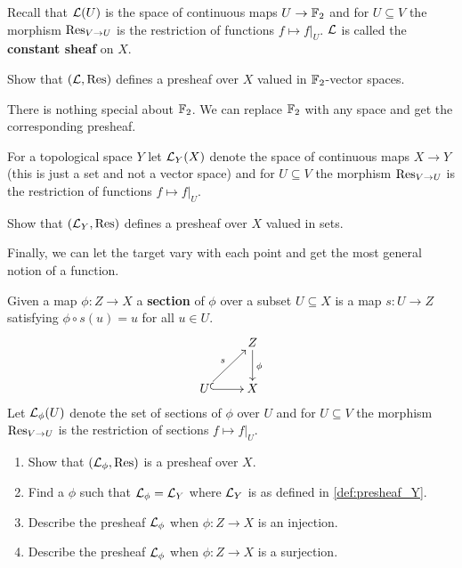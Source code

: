 Recall that $\mathcal{L}(U)$ is the space of continuous maps $U \rightarrow \mathbb{F}_2$ and for $U \subseteq V$ the morphism $\operatorname{Res}_{V \rightarrow U}$ is the restriction of functions $f \mapsto f|_{U}$. $\mathcal{L}$ is called the \textbf{constant sheaf} on $X$.
\begin{ques}
	Show that $(\mathcal{L}, \operatorname{Res})$ defines a presheaf over $X$ valued in $\mathbb{F}_2$-vector spaces.
\end{ques}
There is nothing special about $\mathbb{F}_2$. We can replace $\mathbb{F}_2$ with any space and get the corresponding presheaf.
\begin{definition}
	\label{def:presheaf_Y}
	For a topological space $Y$ let $\mathcal{L}_Y(X)$ denote the space of continuous maps $X \rightarrow Y$ (this is just a set and not a vector space) and for $U \subseteq V$ the morphism $\operatorname{Res}_{V \rightarrow U}$ is the restriction of functions $f \mapsto f|_{U}$.
\end{definition}
\begin{ques}
	Show that $(\mathcal{L}_Y, \operatorname{Res})$ defines a presheaf over $X$ valued in sets.
\end{ques}
Finally, we can let the target vary with each point and get the most general notion of a function.
\begin{definition}
	Given a map $\phi:Z \rightarrow X$ a \textbf{section} of $\phi$ over a subset $U \subseteq X$ is a map $s: U \rightarrow Z$ satisfying $\phi \circ s(u) = u$ for all $u \in U$.
	\begin{align*}
		\xymatrix{
			& Z \ar^\phi[d] \\
			U \ar@{^{(}->}[r] \ar^s[ru] & X
		}
	\end{align*}
	Let $\mathcal{L}_\phi(U)$ denote the set of sections of $\phi$ over $U$  and for $U \subseteq V$ the morphism $\operatorname{Res}_{V \rightarrow U}$ is the restriction of sections $f \mapsto f|_{U}$.
\end{definition}

\begin{ques}
	\begin{enumerate}
		\item Show that $(\mathcal{L}_\phi, \operatorname{Res})$ is a presheaf over $X$.
		\item Find a $\phi$ such that $\mathcal{L}_\phi = \mathcal{L}_Y$ where $\mathcal{L}_Y$ is as defined in \ref{def:presheaf_Y}.
		\item Describe the presheaf $\mathcal{L}_\phi$ when $\phi: Z \rightarrow X$ is an injection.
		\item Describe the presheaf $\mathcal{L}_\phi$ when $\phi: Z \rightarrow X$ is a surjection.
	\end{enumerate}
\end{ques}

